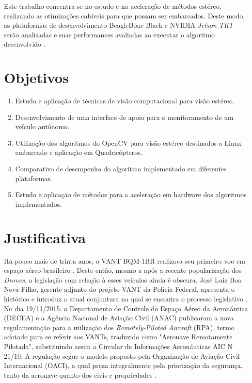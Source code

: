 Este trabalho concentra-se no estudo e na aceleração de métodos estéreo, realizando as otimizações cabíveis para que possam ser embarcados. Deste modo, as plataformas de desenvolvimento BeagleBone Black \cite{BeagleBoardOrg} e NVIDIA \textit{Jetson TK1} \cite{JetsonTK1} serão analisadas e suas performances avaliadas ao executar o algoritmo desenvolvido \cite{Shah2014}. 


\section{Objetivos}
\label{objetivos}

\begin{enumerate}
	\item Estudo e aplicação de técnicas de visão computacional para visão estéreo.
	\item Desenvolvimento de uma interface de apoio para o monitoramento de um veículo autônomo.
	\item Utilização dos algoritmos do OpenCV para visão estéreo destinados a Linux embarcado e aplicação em Quadricópteros.
	\item Comparativo de desempenho do algoritmo implementado em diferentes plataformas.
	\item Estudo e aplicação de métodos para a aceleração em hardware dos algoritmos implementados.
\end{enumerate}


\section{Justificativa}

Há pouco mais de trinta anos, o VANT BQM-1BR realizava seu primeiro voo em espaço aéreo brasileiro \cite{Magno2009}. Deste então, mesmo a após a recente popularização dos \textit{Drones}, a legislação com relação à esses veículos ainda é obscura. José Luiz Boa Nova Filho, gerente-adjunto do projeto VANT da Polícia Federal, apresenta o histórico e introduz a atual conjuntura na qual se encontra o processo legislativo \cite{Filho2014}. No dia 19/11/2015, o Departamento de Controle do Espaço Aéreo da Aeronáutica (DECEA) e a Agência Nacional de Aviação Civil (ANAC) publicaram a nova regulamentação para a utilização dos \textit{Remotely-Piloted Aircraft} (RPA), termo adotado para se referir aos VANTs, traduzido como "Aeronave Remotamente Pilotada", substituindo assim a Circular de Informações Aeronáuticas AIC N 21/10. A regulação segue o modelo proposto pela Organização de Aviação Civil Internacional (OACI), a qual preza integralmente pela priorização da segurança, tanto da aeronave quanto dos civis e propriedades \cite{DECEA2015}. 

